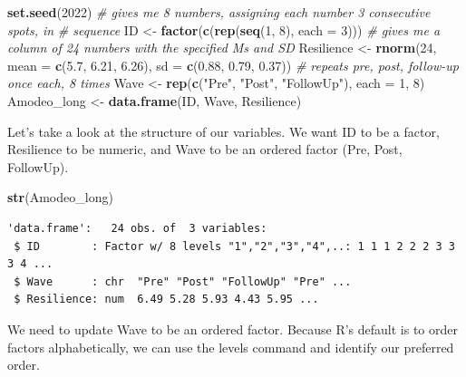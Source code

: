 \documentclass[
  11pt,
]{book}
\newenvironment{Shaded}{\begin{snugshade}}{\end{snugshade}}
\newcommand{\AttributeTok}[1]{\textcolor[rgb]{0.27,0.27,0.27}{#1}}
\newcommand{\CommentTok}[1]{\textcolor[rgb]{0.37,0.37,0.37}{\textit{#1}}}
\newcommand{\DecValTok}[1]{\textcolor[rgb]{0.06,0.06,0.06}{#1}}
\newcommand{\FloatTok}[1]{\textcolor[rgb]{0.06,0.06,0.06}{#1}}
\newcommand{\FunctionTok}[1]{\textcolor[rgb]{0.27,0.27,0.27}{\textbf{#1}}}
\newcommand{\NormalTok}[1]{#1}
\newcommand{\OtherTok}[1]{\textcolor[rgb]{0.37,0.37,0.37}{#1}}
\newcommand{\StringTok}[1]{\textcolor[rgb]{0.5,0.5,0.5}{#1}}
\begin{document}
\begin{Shaded}
\begin{Highlighting}[]
\FunctionTok{set.seed}\NormalTok{(}\DecValTok{2022}\NormalTok{)}
\CommentTok{\# gives me 8 numbers, assigning each number 3 consecutive spots, in}
\CommentTok{\# sequence}
\NormalTok{ID }\OtherTok{\textless{}{-}} \FunctionTok{factor}\NormalTok{(}\FunctionTok{c}\NormalTok{(}\FunctionTok{rep}\NormalTok{(}\FunctionTok{seq}\NormalTok{(}\DecValTok{1}\NormalTok{, }\DecValTok{8}\NormalTok{), }\AttributeTok{each =} \DecValTok{3}\NormalTok{)))}
\CommentTok{\# gives me a column of 24 numbers with the specified Ms and SD}
\NormalTok{Resilience }\OtherTok{\textless{}{-}} \FunctionTok{rnorm}\NormalTok{(}\DecValTok{24}\NormalTok{, }\AttributeTok{mean =} \FunctionTok{c}\NormalTok{(}\FloatTok{5.7}\NormalTok{, }\FloatTok{6.21}\NormalTok{, }\FloatTok{6.26}\NormalTok{), }\AttributeTok{sd =} \FunctionTok{c}\NormalTok{(}\FloatTok{0.88}\NormalTok{, }\FloatTok{0.79}\NormalTok{, }\FloatTok{0.37}\NormalTok{))}
\CommentTok{\# repeats pre, post, follow{-}up once each, 8 times}
\NormalTok{Wave }\OtherTok{\textless{}{-}} \FunctionTok{rep}\NormalTok{(}\FunctionTok{c}\NormalTok{(}\StringTok{"Pre"}\NormalTok{, }\StringTok{"Post"}\NormalTok{, }\StringTok{"FollowUp"}\NormalTok{), }\AttributeTok{each =} \DecValTok{1}\NormalTok{, }\DecValTok{8}\NormalTok{)}
\NormalTok{Amodeo\_long }\OtherTok{\textless{}{-}} \FunctionTok{data.frame}\NormalTok{(ID, Wave, Resilience)}
\end{Highlighting}
\end{Shaded}

Let's take a look at the structure of our variables. We want ID to be a factor, Resilience to be numeric, and Wave to be an ordered factor (Pre, Post, FollowUp).

\begin{Shaded}
\begin{Highlighting}[]
\FunctionTok{str}\NormalTok{(Amodeo\_long)}
\end{Highlighting}
\end{Shaded}

\begin{verbatim}
'data.frame':   24 obs. of  3 variables:
 $ ID        : Factor w/ 8 levels "1","2","3","4",..: 1 1 1 2 2 2 3 3 3 4 ...
 $ Wave      : chr  "Pre" "Post" "FollowUp" "Pre" ...
 $ Resilience: num  6.49 5.28 5.93 4.43 5.95 ...
\end{verbatim}

We need to update Wave to be an ordered factor. Because R's default is to order factors alphabetically, we can use the levels command and identify our preferred order.
\end{document}
